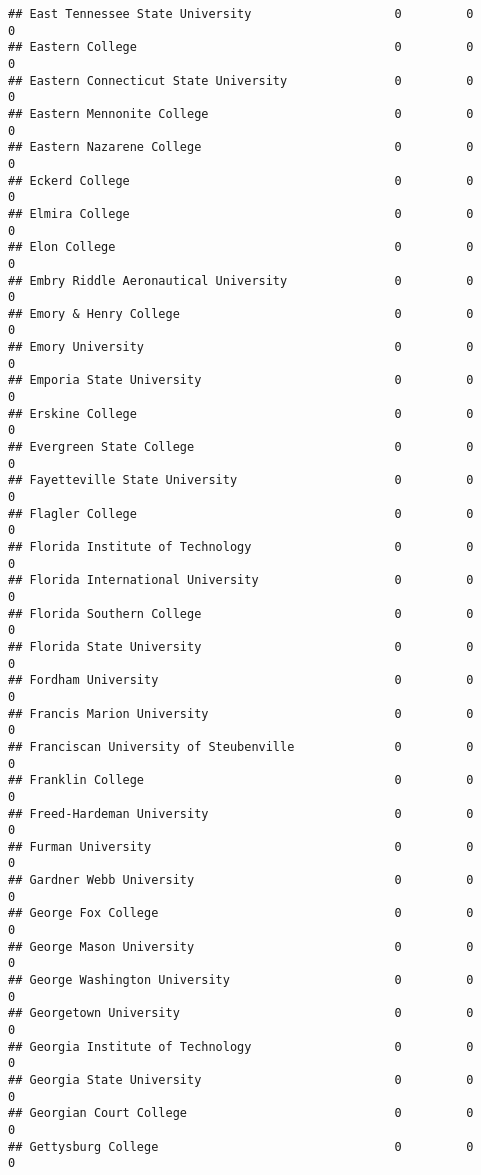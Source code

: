 \documentclass[
]{article}
\begin{document}
\begin{verbatim}
## East Tennessee State University                    0         0         0
## Eastern College                                    0         0         0
## Eastern Connecticut State University               0         0         0
## Eastern Mennonite College                          0         0         0
## Eastern Nazarene College                           0         0         0
## Eckerd College                                     0         0         0
## Elmira College                                     0         0         0
## Elon College                                       0         0         0
## Embry Riddle Aeronautical University               0         0         0
## Emory & Henry College                              0         0         0
## Emory University                                   0         0         0
## Emporia State University                           0         0         0
## Erskine College                                    0         0         0
## Evergreen State College                            0         0         0
## Fayetteville State University                      0         0         0
## Flagler College                                    0         0         0
## Florida Institute of Technology                    0         0         0
## Florida International University                   0         0         0
## Florida Southern College                           0         0         0
## Florida State University                           0         0         0
## Fordham University                                 0         0         0
## Francis Marion University                          0         0         0
## Franciscan University of Steubenville              0         0         0
## Franklin College                                   0         0         0
## Freed-Hardeman University                          0         0         0
## Furman University                                  0         0         0
## Gardner Webb University                            0         0         0
## George Fox College                                 0         0         0
## George Mason University                            0         0         0
## George Washington University                       0         0         0
## Georgetown University                              0         0         0
## Georgia Institute of Technology                    0         0         0
## Georgia State University                           0         0         0
## Georgian Court College                             0         0         0
## Gettysburg College                                 0         0         0

\end{verbatim}
\end{document}
